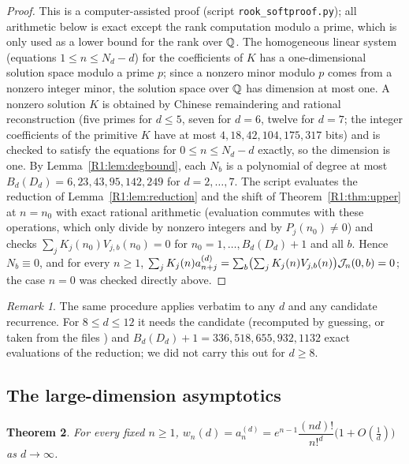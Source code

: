 \documentclass[11pt]{amsart}
\newtheorem{theorem}{Theorem}[section]
\theoremstyle{definition}
\theoremstyle{remark}
\newtheorem{remark}[theorem]{Remark}
\begin{document}
\begin{proof}
This is a computer-assisted proof (script \texttt{rook\_\allowbreak{}softproof.py}); all arithmetic below is
exact except the rank computation modulo a prime, which is only used as a lower bound for
the rank over $\mathbb{Q}$. The homogeneous linear system (equations $1\le n\le N_d-d$) for the
coefficients of $K$ has a one-dimensional solution space modulo a prime $p$; since a nonzero
minor modulo $p$ comes from a nonzero integer minor, the solution space over $\mathbb{Q}$ has
dimension at most one. A nonzero solution $K$ is obtained by Chinese remaindering and rational
reconstruction (five primes for $d\le5$, seven for $d=6$, twelve for $d=7$; the integer
coefficients of the primitive $K$ have at most $4,18,42,104,175,317$ bits) and is checked to
satisfy the equations for $0\le n\le N_d-d$ exactly, so the dimension is one. By
Lemma~\ref{R1:lem:degbound}, each $N_b$ is a polynomial of degree at most
$B_d(D_d)=6,23,43,95,142,249$ for $d=2,\dots,7$. The script
evaluates the reduction of Lemma~\ref{R1:lem:reduction} and the shift of
Theorem~\ref{R1:thm:upper} at $n=n_0$ with exact rational arithmetic (evaluation commutes with
these operations, which only divide by nonzero integers and by $P_j(n_0)\ne0$) and checks
$\sum_jK_j(n_0)V_{j,b}(n_0)=0$ for $n_0=1,\dots,B_d(D_d)+1$ and all $b$. Hence $N_b\equiv0$,
and for every $n\ge1$,
$\sum_jK_j(n)a^{(d)}_{n+j}=\sum_b\bigl(\sum_jK_j(n)V_{j,b}(n)\bigr)\mathcal{J}_n(0,b)=0$; the case
$n=0$ was checked directly above.
\end{proof}

\begin{remark}\label{R1:rem:softlarger}
The same procedure applies verbatim to any $d$ and any candidate recurrence. For
$8\le d\le12$ it needs the candidate (recomputed by guessing, or taken from the files
\cite{R1-KZfiles}) and $B_d(D_d)+1=336,518,655,932,1132$ exact evaluations of the reduction;
we did not carry this out for $d\ge8$.
\end{remark}

\subsection{The large-dimension asymptotics}\label{R1:sec:largeD}

\begin{theorem}\label{R1:thm:largeD}
For every fixed $n\ge1$,
$w_n(d)=a^{(d)}_n=e^{n-1}\dfrac{(nd)!}{n!^d}\bigl(1+O(\tfrac1d)\bigr)$ as $d\to\infty$.
\end{theorem}
\end{document}
